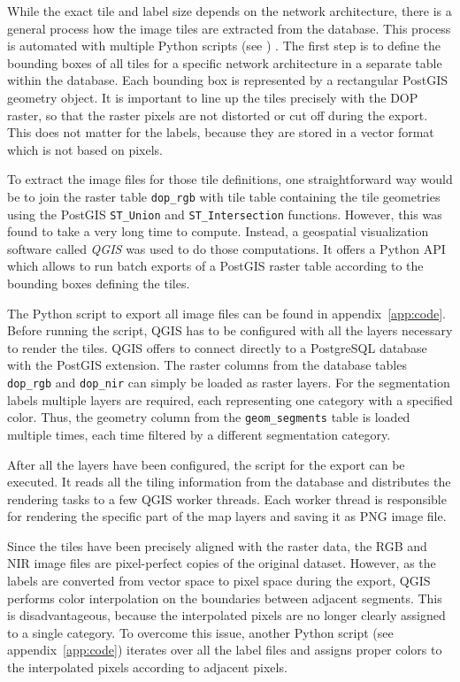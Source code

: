 While the exact tile and label size depends on the network architecture, there is a general process how the image tiles are extracted from the database. This process is automated with multiple Python scripts (see ) . The first step is to define the bounding boxes of all tiles for a specific network architecture in a separate table within the database. Each bounding box is represented by a rectangular PostGIS geometry object. It is important to line up the tiles precisely with the DOP raster, so that the raster pixels are not distorted or cut off during the export. This does not matter for the labels, because they are stored in a vector format which is not based on pixels.

To extract the image files for those tile definitions, one straightforward way would be to join the raster table \texttt{dop\_rgb} with tile table containing the tile geometries using the PostGIS \texttt{ST\_Union} and \texttt{ST\_Intersection} functions. However, this was found to take a very long time to compute. Instead, a geospatial visualization software called \emph{QGIS} was used to do those computations. It offers a Python API which allows to run batch exports of a PostGIS raster table according to the bounding boxes defining the tiles.

The Python script to export all image files can be found in appendix~\ref{app:code}. Before running the script, QGIS has to be configured with all the layers necessary to render the tiles. QGIS offers to connect directly to a PostgreSQL database with the PostGIS extension. The raster columns from the database tables \texttt{dop\_rgb} and \texttt{dop\_nir} can simply be loaded as raster layers. For the segmentation labels multiple layers are required, each representing one category with a specified color. Thus, the geometry column from the \texttt{geom\_segments} table is loaded multiple times, each time filtered by a different segmentation category.

After all the layers have been configured, the script for the export can be executed. It reads all the tiling information from the database and distributes the rendering tasks to a few QGIS worker threads. Each worker thread is responsible for rendering the specific part of the map layers and saving it as PNG image file.

Since the tiles have been precisely aligned with the raster data, the RGB and NIR image files are pixel-perfect copies of the original dataset. However, as the labels are converted from vector space to pixel space during the export, QGIS performs color interpolation on the boundaries between adjacent segments. This is disadvantageous, because the interpolated pixels are no longer clearly assigned to a single category. To overcome this issue, another Python script (see appendix~\ref{app:code}) iterates over all the label files and assigns proper colors to the interpolated pixels according to adjacent pixels.


